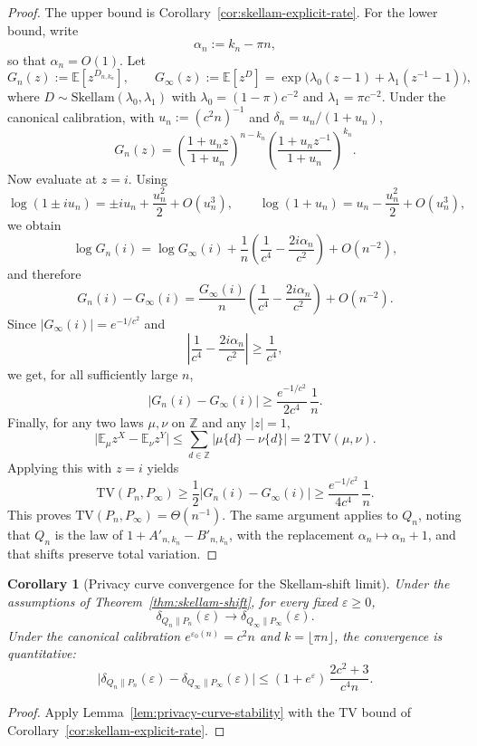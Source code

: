 \documentclass{article}
\newtheorem{corollary}[theorem]{Corollary}
\begin{document}
\begin{proof}
The upper bound is Corollary~\ref{cor:skellam-explicit-rate}. For the lower bound, write
\[
\alpha_n:=k_n-\pi n,
\]
so that $\alpha_n=O(1)$. Let
\[
G_n(z):=\mathbb E[z^{D_{n,k_n}}],
\qquad
G_\infty(z):=\mathbb E[z^{D}]
=\exp\bigl(\lambda_0(z-1)+\lambda_1(z^{-1}-1)\bigr),
\]
where $D\sim\mathrm{Skellam}(\lambda_0,\lambda_1)$ with
$\lambda_0=(1-\pi)c^{-2}$ and $\lambda_1=\pi c^{-2}$. Under the canonical calibration, with
$u_n:=(c^2 n)^{-1}$ and $\delta_n=u_n/(1+u_n)$,
\[
G_n(z)=\left(\frac{1+u_n z}{1+u_n}\right)^{n-k_n}
\left(\frac{1+u_n z^{-1}}{1+u_n}\right)^{k_n}.
\]
Now evaluate at $z=i$. Using
\[
\log(1\pm iu_n)=\pm i u_n + \frac{u_n^2}{2}+O(u_n^3),
\qquad
\log(1+u_n)=u_n-\frac{u_n^2}{2}+O(u_n^3),
\]
we obtain
\[
\log G_n(i)
=\log G_\infty(i)+\frac1n\left(\frac1{c^4}-\frac{2i\alpha_n}{c^2}\right)+O(n^{-2}),
\]
and therefore
\[
G_n(i)-G_\infty(i)
=\frac{G_\infty(i)}{n}\left(\frac1{c^4}-\frac{2i\alpha_n}{c^2}\right)+O(n^{-2}).
\]
Since $|G_\infty(i)|=e^{-1/c^2}$ and
\[
\left|\frac1{c^4}-\frac{2i\alpha_n}{c^2}\right|\ge \frac1{c^4},
\]
we get, for all sufficiently large $n$,
\[
|G_n(i)-G_\infty(i)|\ge \frac{e^{-1/c^2}}{2c^4}\,\frac1n.
\]
Finally, for any two laws $\mu,\nu$ on $\mathbb Z$ and any $|z|=1$,
\[
\bigl|\mathbb E_\mu z^X-\mathbb E_\nu z^Y\bigr|
\le \sum_{d\in\mathbb Z}|\mu\{d\}-\nu\{d\}|
=2\,\mathrm{TV}(\mu,\nu).
\]
Applying this with $z=i$ yields
\[
\mathrm{TV}(P_n,P_\infty)
\ge \frac12 |G_n(i)-G_\infty(i)|
\ge \frac{e^{-1/c^2}}{4c^4}\,\frac1n.
\]
This proves $\mathrm{TV}(P_n,P_\infty)=\Theta(n^{-1})$. The same argument applies to $Q_n$, noting that
$Q_n$ is the law of $1+A'_{n,k_n}-B'_{n,k_n}$, with the replacement $\alpha_n\mapsto \alpha_n+1$, and
that shifts preserve total variation.
\end{proof}

\begin{corollary}[Privacy curve convergence for the Skellam-shift limit]
\label{cor:skellam-privacy-curve-convergence}
Under the assumptions of Theorem~\ref{thm:skellam-shift}, for every fixed $\varepsilon \geq 0$,
\[
\delta_{Q_n\|P_n}(\varepsilon) \to \delta_{Q_\infty\|P_\infty}(\varepsilon).
\]
Under the canonical calibration $e^{\varepsilon_0(n)} = c^2 n$ and $k = \lfloor \pi n \rfloor$, the convergence is quantitative:
\[
\bigl|\delta_{Q_n\|P_n}(\varepsilon) - \delta_{Q_\infty\|P_\infty}(\varepsilon)\bigr|
\leq (1 + e^\varepsilon)\,\frac{2c^2 + 3}{c^4 n}.
\]
\end{corollary}

\begin{proof}
Apply Lemma~\ref{lem:privacy-curve-stability} with the TV bound of Corollary~\ref{cor:skellam-explicit-rate}.
\end{proof}
\end{document}
